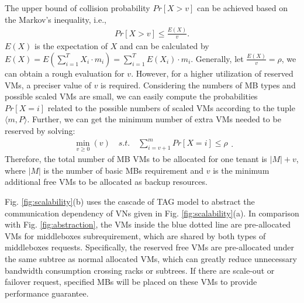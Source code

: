 \documentclass[review]{elsarticle}
\begin{document}
The upper bound of collision probability $Pr\left[X>v\right]$ can be achieved based on the Markov's inequality, i.e.,
\begin{equation}
\begin{aligned} 
Pr\left[X>v\right]\leq \frac{E(X)}{v}.
\end{aligned}
\end{equation} 
$E(X)$ is the expectation of $X$ and can be calculated by $E(X)=E(\sum_{i=1}^{T}X_{i}\cdot m_{i}) = \sum_{i=1}^{T}E(X_i)\cdot m_i$. Generally, let $\frac{E(X)}{v}=\rho$, we can obtain a rough evaluation for $v$.
However, for a higher utilization of reserved VMs, a preciser  value of $v$ is required.
Considering the numbers of MB types and possible scaled VMs are small, we can easily compute the probabilities $Pr\left[X=i\right]$ related to the possible numbers of scaled VMs according to the tuple $\langle m, P \rangle$.
Further, we can get the minimum number of extra VMs needed to be reserved by solving: 
\begin{equation}
\begin{aligned}
\min\limits_{v\geq 0}(v) \quad s.t. \quad \sum_{i=v+1}^{m}Pr\left[X=i \right] \leq \rho
\end{aligned} .
\end{equation}
Therefore, the total number of MB VMs to be allocated for one tenant is $|M|+v$, where $|M|$ is the number of basic MBs requirement and $v$ is the minimum additional free VMs to be allocated as backup resources. %


Fig. \ref{fig:scalability}(b) uses the cascade of TAG model to abstract the communication dependency of VNs given in Fig. \ref{fig:scalability}(a). In comparison with Fig. \ref{fig:abstraction}, the VMs inside the blue dotted line are pre-allocated VMs for middleboxes subrequirement, which are shared by both types of middleboxes requests.
Specifically, the reserved free VMs are pre-allocated under the same subtree as normal allocated VMs, which can greatly reduce unnecessary  bandwidth consumption crossing racks or subtrees. If there are scale-out or failover request, specified MBs will be placed on these VMs to provide performance guarantee. %
\end{document}
